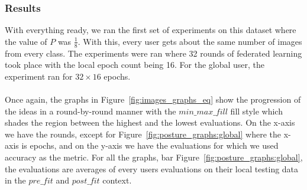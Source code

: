 \documentclass[12pt]{article}
\begin{document}
\subsubsection{Results}
With everything ready, we ran the first set of experiments on this dataset where the value of $P$ was $\tfrac{1}{8}$. With this, every user gets about the same number of images from every class. The experiments were ran where 32 rounds of federated learning took place with the local epoch count being 16. For the global user, the experiment ran for $32 \times 16$ epochs. 
\\\\
Once again, the graphs in Figure~\ref{fig:images_graphs_eq} show the progression of the ideas in a round-by-round manner with the $min\_max\_fill$ fill style which shades the region between the highest and the lowest evaluations. On the x-axis we have the rounds, except for Figure~\ref{fig:posture_graphs:global} where the x-axis is epochs, and on the y-axis we have the evaluations for which we used accuracy as the metric. For all the graphs, bar Figure~\ref{fig:posture_graphs:global}, the evaluations are averages of every users evaluations on their local testing data in the $pre\_fit$ and $post\_fit$ context.
\end{document}
